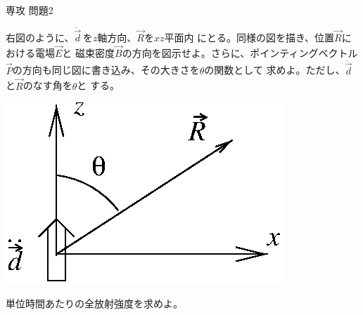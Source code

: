 \documentclass[fleqn]{jbook}
\begin{document}
\begin{question}{専攻 問題2}{}
\begin{subquestions}
\SubQuestion
\parbox[t]{100mm}{
  右図のように、$\ddot{\vec{d}}$\,を$z$軸方向、$\vec{R}$を$xz$平面内
  にとる。同様の図を描き、位置$\vec{R}$における電場$\vec{E}$と
  磁束密度$\vec{B}$の方向を図示せよ。さらに、ポインティングベクトル
  $\vec{P}$の方向も同じ図に書き込み、その大きさを$\theta$の関数として
  求めよ。ただし、$\ddot{\vec{d}}$\,と$\vec{R}$のなす角を$\theta$と
  する。
}\parbox[t]{60mm}{\vspace*{-20mm}
  \begin{center}
    \mbox{\includegraphics[clip]{1994phy2-2.eps}}
  \end{center}}

\SubQuestion
  単位時間あたりの全放射強度を求めよ。

\end{subquestions}
\end{question}
\end{document}
